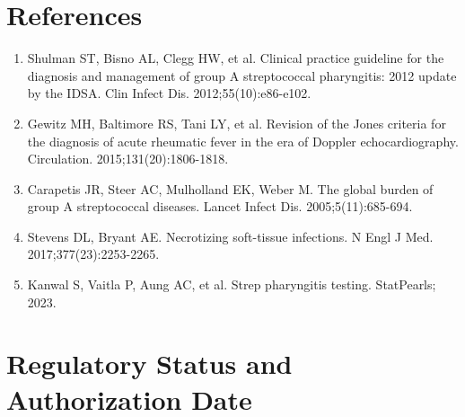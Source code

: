 \section*{References}
\begin{enumerate}
  \item Shulman ST, Bisno AL, Clegg HW, et al. Clinical practice guideline for the diagnosis and management of group A streptococcal pharyngitis: 2012 update by the IDSA. Clin Infect Dis. 2012;55(10):e86-e102.
  \item Gewitz MH, Baltimore RS, Tani LY, et al. Revision of the Jones criteria for the diagnosis of acute rheumatic fever in the era of Doppler echocardiography. Circulation. 2015;131(20):1806-1818.
  \item Carapetis JR, Steer AC, Mulholland EK, Weber M. The global burden of group A streptococcal diseases. Lancet Infect Dis. 2005;5(11):685-694.
  \item Stevens DL, Bryant AE. Necrotizing soft-tissue infections. N Engl J Med. 2017;377(23):2253-2265.
  \item Kanwal S, Vaitla P, Aung AC, et al. Strep pharyngitis testing. StatPearls; 2023.
\end{enumerate}

\clearpage
\section*{Regulatory Status and Authorization Date}

\clearpage
